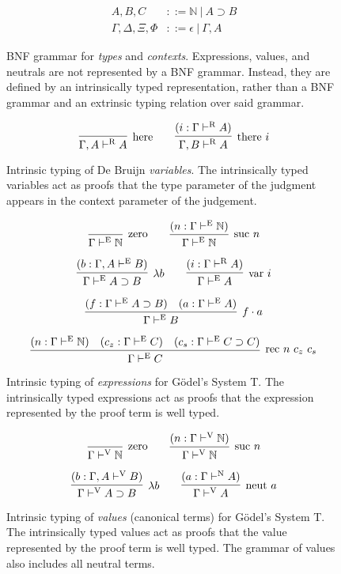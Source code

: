 \documentclass{llncs}
\def\arr{\supset}
\def\app{\cdot}
\def\lam{\lambda}
\def\nat{\mathbb{N}}
\def\emp{\epsilon}
\newcommand{\turn}[1]{\vdash^\con{#1}}
\newcommand{\con}[1]{\textmd{#1}}
\newcommand{\fun}[1]{\textmd{#1}}
\newcommand{\type}[1]{\Gamma \turn{E} #1}
\newcommand{\ctype}[2]{\Gamma , #1 \turn{E} #2}
\newcommand{\typv}[1]{\Gamma \turn{V} #1}
\newcommand{\ctypv}[2]{\Gamma , #1 \turn{V} #2}
\newcommand{\typn}[1]{\Gamma \turn{N} #1}
\newcommand{\typr}[1]{\Gamma \turn{R} #1}
\newcommand{\ctypr}[2]{\Gamma , #1 \turn{R} #2}
\begin{document}
\clearpage

\begin{figure}
\caption{
BNF grammar for \textit{types} and \textit{contexts}. 
Expressions, values, and neutrals
are not represented by a BNF grammar. Instead, they are defined by
an intrinsically typed representation, rather than a BNF grammar and
an extrinsic typing relation over said grammar.
}
\begin{align*}
A, B, C &::= \nat ~ | ~ A \arr B \\
\Gamma, \Delta, \Xi, \Phi &::= \emp ~ | ~ \Gamma , A
\end{align*}
\label{fig:gram}
\end{figure}

\begin{figure}
\caption{
Intrinsic typing of De Bruijn \textit{variables}.
The intrinsically typed variables act as proofs that the type
parameter of the judgment appears in the context parameter of the
judgement.
}
$$
\infer
  [\con{here}]
  {\ctypr{A}{A}}
{
}
\qquad
\infer
  [\con{there} ~ i]
  {\ctypr{B}{A}}
{
  (i : \typr{A})
}
$$
\label{fig:typr}
\end{figure}

\begin{figure}
\caption{
Intrinsic typing of \textit{expressions} for G{\"o}del's System T. The
intrinsically typed expressions act as proofs that the expression
represented by the proof term is well typed.
}
$$
\infer
  [\con{zero}]
  {\type{\nat}}
{}
\qquad
\infer
  [\con{suc} ~ n]
  {\type{\nat}}
{
  (n : \type{\nat})
}
$$

$$
\infer
  [\lam b]
  {\type{A \arr B}}
{
  (b : \ctype{A}{B})
}
\qquad
\infer
  [\fun{var} ~ i]
  {\type{A}}
{
  (i : \typr{A})
}
$$

$$
\infer
  [f \app a]
  {\type{B}}
{
  (f : \type{A \arr B})
  &
  (a : \type{A})
}
$$

$$
\infer
  [\fun{rec} ~ n ~ c_z ~ c_s]
  {\type{C}}
{
  (n : \type{\nat})
  &
  (c_z : \type{C})
  &
  (c_s : \type{C \arr C})
}
$$
\label{fig:type}
\end{figure}

\begin{figure}
\caption{
Intrinsic typing of \textit{values} (canonical terms) for G{\"o}del's System T.
The intrinsically typed values act as proofs that the value
represented by the proof term is well typed. The grammar of values
also includes all neutral terms.
}
$$
\infer
  [\con{zero}]
  {\typv{\nat}}
{}
\qquad
\infer
  [\con{suc} ~ n]
  {\typv{\nat}}
{
  (n : \typv{\nat})
}
$$

$$
\infer
  [\lam b]
  {\typv{A \arr B}}
{
  (b : \ctypv{A}{B})
}
\qquad
\infer
  [\fun{neut} ~ a]
  {\typv{A}}
{
  (a : \typn{A})
}
$$
\label{fig:typv}
\end{figure}
\end{document}
